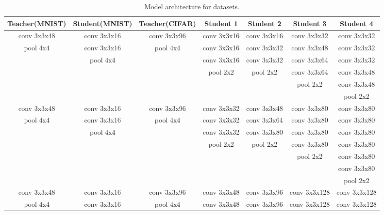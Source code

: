 \documentclass[journal]{IEEEtran}
\begin{document}
\begin{table*}[htb]
\renewcommand\arraystretch{1}
\centering
\small
\setlength{\abovecaptionskip}{0.2cm}
\setlength{\belowcaptionskip}{0.2cm}
\caption{Model architecture for datasets.}
\begin{tabular}{|c|c|c|c|c|c|c|}
\hline
Teacher(MNIST)  &  Student(MNIST)  &  Teacher(CIFAR)  &   Student 1  &  Student 2  &  Student 3  &  Student 4  \\
\hline
\hline
conv 3x3x48  &  conv 3x3x16  &  conv 3x3x96  &  conv 3x3x16  &  conv 3x3x16  &  conv 3x3x32  &  conv 3x3x32  \\
pool 4x4     &  conv 3x3x16  &  pool 4x4     &  conv 3x3x16  &  conv 3x3x32  &  conv 3x3x48  &  conv 3x3x32  \\
           &  pool 4x4     &               &  conv 3x3x16  &  conv 3x3x32  &  conv 3x3x64  &  conv 3x3x32  \\
           &               &               &  pool 2x2     &  pool 2x2     &  conv 3x3x64  &  conv 3x3x48  \\
           &               &               &               &               &  pool 2x2     &  conv 3x3x48  \\
           &               &               &               &               &               &  pool 2x2     \\
\hline
conv 3x3x48  &  conv 3x3x16  &  conv 3x3x96  &  conv 3x3x32  &  conv 3x3x48  &  conv 3x3x80  &  conv 3x3x80  \\
pool 4x4     &  conv 3x3x16  &  pool 4x4     &  conv 3x3x32  &  conv 3x3x64  &  conv 3x3x80  &  conv 3x3x80  \\
           &  pool 4x4     &               &  conv 3x3x32  &  conv 3x3x80  &  conv 3x3x80  &  conv 3x3x80  \\
           &               &               &  pool 2x2     &  pool 2x2     &  conv 3x3x80  &  conv 3x3x80  \\
           &               &               &               &               &  pool 2x2     &  conv 3x3x80  \\
           &               &               &               &               &               &  conv 3x3x80  \\
           &               &               &               &               &               &  pool 2x2     \\
\hline
conv 3x3x48  &  conv 3x3x16  &  conv 3x3x96  &  conv 3x3x48  &  conv 3x3x96  &  conv 3x3x128 &  conv 3x3x128  \\
pool 4x4     &  conv 3x3x16  &  pool 4x4     &  conv 3x3x48  &  conv 3x3x96  &  conv 3x3x128 &  conv 3x3x128  \\

\end{tabular}
\end{table*}
\end{document}
